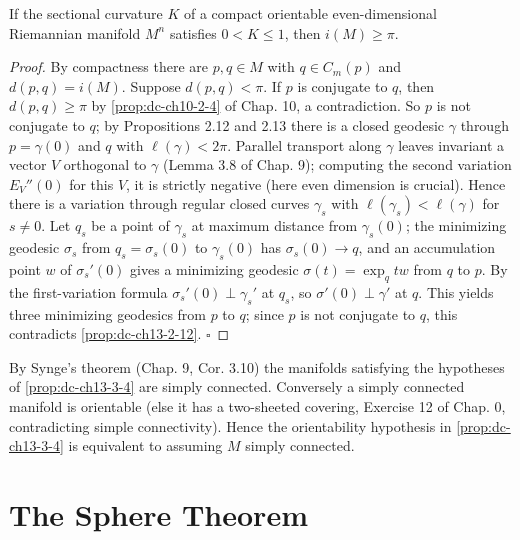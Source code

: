 \begin{proposition}
  \label{prop:dc-ch13-3-4}
  If the sectional curvature $K$ of a compact orientable even-dimensional Riemannian
  manifold $M^n$ satisfies $0<K\leq 1$, then $i(M)\geq\pi$.
\end{proposition}
\begin{proof}
  By compactness there are $p,q\in M$ with $q\in C_m(p)$ and $d(p,q)=i(M)$.
  Suppose $d(p,q)<\pi$. If $p$ is conjugate to $q$, then $d(p,q)\geq\pi$ by
  \cref{prop:dc-ch10-2-4} of Chap. 10, a contradiction. So $p$ is not conjugate to $q$; by
  Propositions 2.12 and 2.13 there is a closed geodesic $\gamma$ through $p=\gamma(0)$
  and $q$ with $\ell(\gamma)<2\pi$. Parallel transport along $\gamma$ leaves invariant
  a vector $V$ orthogonal to $\gamma$ (Lemma 3.8 of Chap. 9); computing the second
  variation $E_V''(0)$ for this $V$, it is strictly negative (here even dimension is
  crucial). Hence there is a variation through regular closed curves $\gamma_s$ with
  $\ell(\gamma_s)<\ell(\gamma)$ for $s\neq0$. Let $q_s$ be a point of $\gamma_s$ at
  maximum distance from $\gamma_s(0)$; the minimizing geodesic $\sigma_s$ from
  $q_s=\sigma_s(0)$ to $\gamma_s(0)$ has $\sigma_s(0)\to q$, and an accumulation point
  $w$ of $\sigma_s'(0)$ gives a minimizing geodesic $\sigma(t)=\exp_q tw$ from $q$ to
  $p$. By the first-variation formula $\sigma_s'(0)\perp\gamma_s'$ at $q_s$, so
  $\sigma'(0)\perp\gamma'$ at $q$. This yields three minimizing geodesics from $p$ to
  $q$; since $p$ is not conjugate to $q$, this contradicts \cref{prop:dc-ch13-2-12}. $\square$
\end{proof}

\begin{remark}[Remark 3.5]
  \label{rem:dc-ch13-3-5}
  By Synge's theorem (Chap. 9, Cor. 3.10) the manifolds satisfying the hypotheses of
  \cref{prop:dc-ch13-3-4} are simply connected. Conversely a simply connected manifold is
  orientable (else it has a two-sheeted covering, Exercise 12 of Chap. 0,
  contradicting simple connectivity). Hence the orientability hypothesis in
  \cref{prop:dc-ch13-3-4} is equivalent to assuming $M$ simply connected.
\end{remark}

\section{The Sphere Theorem}

